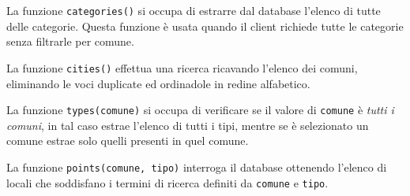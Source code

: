 La funzione \texttt{categories()} si occupa di estrarre dal database l'elenco di tutte delle categorie. Questa funzione è usata quando il client richiede tutte le categorie senza filtrarle per comune.

La funzione \texttt{cities()} effettua una ricerca ricavando l'elenco dei comuni, eliminando le voci duplicate ed ordinadole in redine alfabetico.

La funzione \texttt{types(comune)} si occupa di verificare se il valore di \texttt{comune} è \emph{tutti i comuni}, in tal caso estrae l'elenco di tutti i tipi, mentre se è selezionato un comune estrae solo quelli presenti in quel comune.

La funzione \texttt{points(comune, tipo)} interroga il database ottenendo l'elenco di locali che soddisfano i termini di ricerca definiti da \texttt{comune} e \texttt{tipo}.





